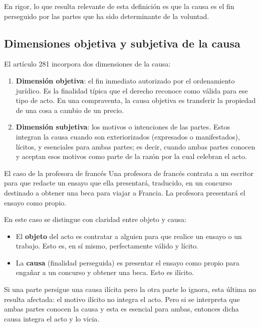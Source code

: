\documentclass[12pt,oneside]{book}
\begin{document}
En rigor, lo que resulta relevante de esta definición es que la causa es el fin perseguido por las partes que ha sido determinante de la voluntad.

\subsection{Dimensiones objetiva y subjetiva de la causa}

El artículo 281 incorpora dos dimensiones de la causa:

\begin{enumerate}
    \item \textbf{Dimensión objetiva}: el fin inmediato autorizado por el ordenamiento jurídico. Es la finalidad típica que el derecho reconoce como válida para ese tipo de acto. En una compraventa, la causa objetiva es transferir la propiedad de una cosa a cambio de un precio.
    \item \textbf{Dimensión subjetiva}: los motivos o intenciones de las partes. Estos integran la causa cuando son exteriorizados (expresados o manifestados), lícitos, y esenciales para ambas partes; es decir, cuando ambas partes conocen y aceptan esos motivos como parte de la razón por la cual celebran el acto.
\end{enumerate}

\begin{example}{El caso de la profesora de francés}
Una profesora de francés contrata a un escritor para que redacte un ensayo que ella presentará, traducido, en un concurso destinado a obtener una beca para viajar a Francia. La profesora presentará el ensayo como propio.

En este caso se distingue con claridad entre objeto y causa:
\begin{itemize}
    \item El \textbf{objeto} del acto es contratar a alguien para que realice un ensayo o un trabajo. Esto es, en sí mismo, perfectamente válido y lícito.
    \item La \textbf{causa} (finalidad perseguida) es presentar el ensayo como propio para engañar a un concurso y obtener una beca. Esto es ilícito.
\end{itemize}

Si una parte persigue una causa ilícita pero la otra parte lo ignora, esta última no resulta afectada: el motivo ilícito no integra el acto. Pero si se interpreta que ambas partes conocen la causa y esta es esencial para ambas, entonces dicha causa integra el acto y lo vicia.
\end{example}
\end{document}
